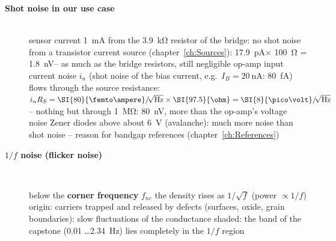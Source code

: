 \begin{description}
\item[{\rot\bf Shot noise in our use case}]~\\[-\lblskip]
\bi
	\ite sensor current \SI{1}{\milli\ampere}
	\itee from the \SI{3.9}{\kilo\ohm} resistor of the bridge: no shot noise
	\itee from a transistor current source (chapter~\ref{ch:Sources}): \SI{17.9}{\pico\ampere}\rtHz $\times$ \SI{100}{\ohm} = \SI{1.8}{\nano\volt}\rtHz -- as much as the bridge resistors, still negligible
	\ite op-amp input current noise $i_n$ (shot noise of the bias current, e.g.\ $I_B = \SI{20}{\nano\ampere}$: \SI{80}{\femto\ampere}\rtHz)
	\itee flows through the source resistance: $i_n R_S = \SI{80}{\femto\ampere}\rtHz \times \SI{97.5}{\ohm} = \SI{8}{\pico\volt}\rtHz$ -- nothing
	\itee but through \SI{1}{\mega\ohm}: \SI{80}{\nano\volt}\rtHz, more than the op-amp's voltage noise
	\ite Zener diodes above about \SI{6}{\volt} (avalanche): much more noise than shot noise -- reason for bandgap references (chapter~\ref{ch:References})
\ei
\os{\newpage}

\item[{\rot\bf $1/f$ noise (flicker noise)}]~\\[-\lblskip]
\begin{center}
\end{center}
\bi
	\ite below the \textbf{corner frequency} $f_{nc}$ the density rises as $1/\sqrt{f}$ (power $\propto 1/f$)
	\ite origin: carriers trapped and released by defects (surfaces, oxide, grain boundaries): slow fluctuations of the conductance
	\ite shaded: the band of the capstone (\SI{0.01}{} \ldots \SI{2.34}{\hertz}) lies completely in the $1/f$ region
\ei
\os{\newpage}


\end{description}
